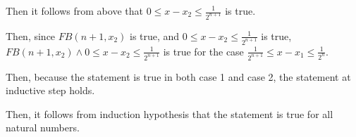 \documentclass[12pt]{article}
\begin{document}
\begin{enumerate}[a.]
    \bigskip

    Then it follows from above that $0 \leq x - x_2 \leq \frac{1}{2^{n+1}}$
    is true.

    \bigskip

    Then, since $FB(n+1,x_2)$ is true, and $0 \leq x - x_2 \leq \frac{1}{2^{n+1}}$ is true,
    $FB(n+1,x_2) \land 0 \leq x - x_2 \leq \frac{1}{2^{n+1}}$ is true for the case
    $\frac{1}{2^{n+1}} \leq x - x_1 \leq \frac{1}{2^{n}}$.

    \bigskip

    Then, because the statement is true in both case 1 and case 2, the statement
    at inductive step holds.

    \bigskip

    Then, it follows from induction hypothesis that the statement is true for all
    natural numbers.

\end{enumerate}
\end{document}
